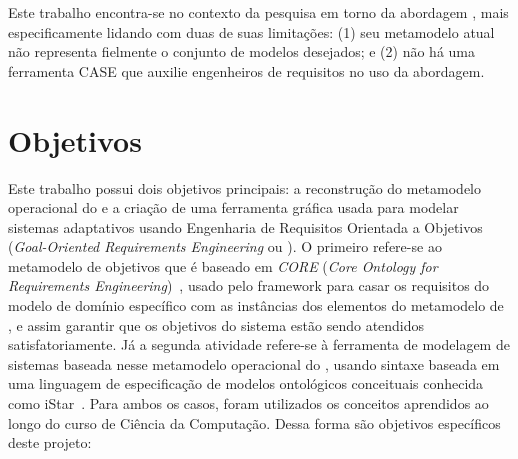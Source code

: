 Este trabalho encontra-se no contexto da pesquisa em torno da abordagem \zanshin, mais especificamente lidando com duas de suas limitações: (1) seu metamodelo atual não representa fielmente o conjunto de modelos desejados; e (2) não há uma ferramenta CASE que auxilie engenheiros de requisitos no uso da abordagem.



\section{Objetivos}
\label{sec-intro-objetivos}

Este trabalho possui dois objetivos principais: a reconstrução do metamodelo operacional do \zanshin e a criação de uma ferramenta gráfica usada para modelar sistemas adaptativos usando Engenharia de Requisitos Orientada a Objetivos (\textit{Goal-Oriented Requirements Engineering} ou \gore). O primeiro refere-se ao metamodelo de objetivos que é baseado em \textit{CORE} (\textit{Core Ontology for Requirements Engineering})~\cite{jureta2007core}, usado pelo framework para casar os requisitos do modelo de domínio específico com as instâncias dos elementos do metamodelo de \gore, e assim garantir que os objetivos do sistema estão sendo atendidos satisfatoriamente. Já a segunda atividade refere-se à ferramenta de modelagem de sistemas baseada nesse metamodelo operacional do \zanshin, usando sintaxe baseada em uma linguagem de especificação de modelos ontológicos conceituais conhecida como iStar~\cite{dalpiaz2016istar}. Para ambos os casos, foram utilizados os conceitos aprendidos ao longo do curso de Ciência da Computação. Dessa forma são objetivos específicos deste projeto:


